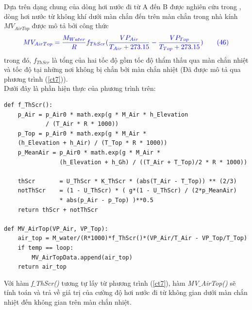 \documentclass[13pt,a4paper]{article}
\begin{document}
			Dựa trên dạng chung của dòng hơi nước đi từ A đến B được nghiên cứu trong \autocite{Van11}, dòng hơi nước từ không khí dưới màn chắn đến trên màn chắn trong nhà kính $MV_{AirTop}$ được mô tả bởi công thức
			\begin{align}
				\color{blue}
					MV_{AirTop} = \frac{M_{Water}}{R}f_{ThScr}(\dfrac{VP_{Air}}{T_{Air} + 273.15} - \dfrac{VP_{Top}}{T_{Top} + 273.15})
				\color{blue}
				\tag{46}\label{vp20}
			\end{align}
			trong đó, $f_{ThScr}$ là tổng của hai tốc độ gồm tốc độ thẩm thấu qua màn chắn nhiệt và tốc độ tại những nơi không bị chắn bởi màn chắn nhiệt (Đã được mô tả qua phương trình (\ref{ct7})). \\
			Dưới đây là phần hiện thực của phương trình trên:
\begin{lstlisting}
def f_ThScr():
	p_Air = p_Air0 * math.exp(g * M_Air * h_Elevation
			/ (T_Air * R * 1000))
	p_Top = p_Air0 * math.exp(g * M_Air *
	(h_Elevation + h_Air) / (T_Top * R * 1000)) 
	p_MeanAir = p_Air0 * math.exp(g * M_Air *
				(h_Elevation + h_Gh) / ((T_Air + T_Top)/2 * R * 1000))
	
	thScr       = U_ThScr * K_ThScr * (abs(T_Air - T_Top)) ** (2/3)
	notThScr    = (1 - U_ThScr) * ( g*(1 - U_ThScr) / (2*p_MeanAir) 
				* abs(p_Air - p_Top) )**0.5
	return thScr + notThScr
	
def MV_AirTop(VP_Air, VP_Top):
	air_top = M_water/(R*1000)*f_ThScr()*(VP_Air/T_Air - VP_Top/T_Top)
	if temp == loop:
		MV_AirTopData.append(air_top)
	return air_top
\end{lstlisting}
			Với hàm \textit{f$\_$ThScr()} tương tự lấy từ phương trình (\ref{ct7}), hàm \textit{MV$\_$AirTop()} sẽ tính toán và trả về giá trị của cường độ hơi nước đi từ không gian dưới màn chắn nhiệt đến không gian trên màn chắn nhiệt. \\ \\
			
\end{document}
